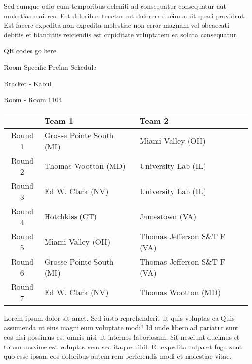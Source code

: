 \documentclass{article}%
\begin{document}
\newline%
Sed cumque odio eum temporibus deleniti ad consequatur consequatur aut molestias maiores. Est doloribus tenetur est dolorem ducimus sit quasi provident. Est facere expedita non expedita molestiae non error magnam vel obcaecati debitis et blanditiis reiciendis est cupiditate voluptatem ea soluta consequatur.%
\vspace*{140pt}%
\begin{center}%
\begin{Huge}%
QR codes go here%
\end{Huge}%
\end{center}%
\newpage%
\begin{center}%
\begin{Huge}%
Room Specific Prelim Schedule%
\end{Huge}%
\vspace*{8pt}%
\linebreak%
\begin{Large}%
Bracket {-} Kabul%
\end{Large}%
\vspace*{8pt}%
\linebreak%
\vspace*{8pt}%
\begin{Large}%
Room {-} Room 1104%
\end{Large}%
\end{center}%
%
\begin{tabularx}{\textwidth}{|c|Y|Y|}%
\hline%
&Team 1&Team 2\\%
\hline%
Round 1&Grosse Pointe South (MI)&Miami Valley (OH)\\%
Round 2&Thomas Wootton (MD)&University Lab (IL)\\%
Round 3&Ed W. Clark (NV)&University Lab (IL)\\%
Round 4&Hotchkiss (CT)&Jamestown (VA)\\%
Round 5&Miami Valley (OH)&Thomas Jefferson S\&T F (VA)\\%
Round 6&Grosse Pointe South (MI)&Thomas Jefferson S\&T F (VA)\\%
Round 7&Ed W. Clark (NV)&Thomas Wootton (MD)\\%
\hline%
\end{tabularx}%
\vspace*{8pt}%
\newline%
Lorem ipsum dolor sit amet. Sed iusto reprehenderit ut quis voluptas ea Quis assumenda ut eius magni eum voluptate modi? Id unde libero ad pariatur sunt eos nisi possimus est omnis nisi ut internos laboriosam. Sit nesciunt ducimus et totam maxime est voluptas vero sed itaque nihil. Et expedita culpa et fuga sunt quo esse ipsam eos doloribus autem rem perferendis modi et molestiae vitae.\newline%
\end{document}
